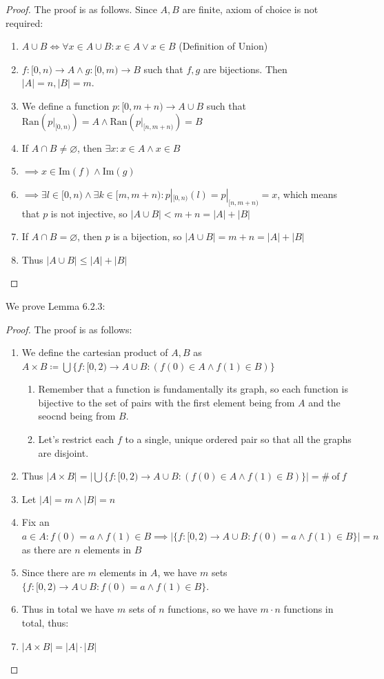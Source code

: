 \documentclass{article}
\begin{document}
\begin{proof} The proof is as follows. Since $A, B$ are finite, axiom of choice is not required:
\begin{enumerate}
    \item $A \cup B \iff \forall x \in A \cup B: x \in A \lor x \in B$ (Definition of Union)
    \item $f: [0, n) \xrightarrow{} A \land g: [0, m) \xrightarrow{} B$ such that $f, g$ are bijections. Then $|A| = n, |B| = m$.
    \item We define a function $p: [0, m+n) \xrightarrow{} A \cup B$ such that $\text{Ran}(p|_{[0, n)}) = A \land \text{Ran}(p|_{[n, m+n)}) = B$
    \item If $A \cap B \neq \varnothing$, then $\exists x: x \in A \land x \in B$
    \item $\implies x \in \text{Im}(f) \land \text{Im}(g)$
    \item $\implies \exists l \in [0, n) \land \exists k \in [m, m+n): p|_{[0, n)}(l) = p|_{[n, m+n)} = x$, which means that $p$ is not injective, so $|A \cup B| < m + n = |A| + |B|$
    \item If $A \cap B = \varnothing$, then $p$ is a bijection, so $|A \cup B| = m + n = |A| + |B|$
    \item Thus $|A \cup B| \leqslant |A| + |B|$
\end{enumerate}
\end{proof}
We prove Lemma 6.2.3:
\begin{proof} 
The proof is as follows:
\begin{enumerate}
    \item We define the cartesian product of $A, B$ as $A \times B \coloneq \bigcup \{f: [0, 2) \xrightarrow{} A \cup B: (f(0) \in A \land f(1) \in B)\}$
    \begin{enumerate}
        \item Remember that a function is fundamentally its graph, so each function is bijective to the set of pairs with the first element being from $A$ and the seocnd being from $B$.
        \item Let's restrict each $f$ to a single, unique ordered pair so that all the graphs are disjoint.
    \end{enumerate}
    \item Thus $|A \times B| = |\bigcup \{f: [0, 2) \xrightarrow{} A \cup B: (f(0) \in A \land f(1) \in B)\}| = \# \ \text{of} \ f$
    \item Let $|A| = m \land |B| = n$
    \item Fix an $a \in A: f(0) = a \land f(1) \in B \implies |\{f: [0, 2) \xrightarrow{} A \cup B: f(0) = a \land f(1) \in B\}| = n$ as there are $n$ elements in $B$
    \item Since there are $m$ elements in $A$, we have $m$ sets  $\{f: [0, 2) \xrightarrow{} A \cup B: f(0) = a \land f(1) \in B\}$.
    \item Thus in total we have $m$ sets of $n$ functions, so we have $m \cdot n$ functions in total, thus:
    \item $|A \times B| = |A| \cdot |B|$
\end{enumerate}
\end{proof}
\end{document}
